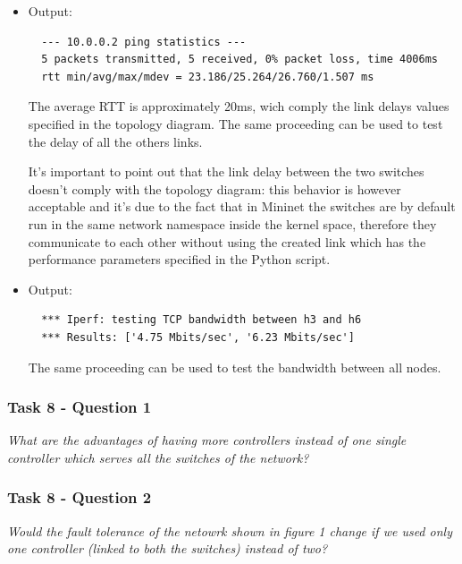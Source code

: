 \begin{itemize}
  \item {}

  Output:
  \begin{lstlisting}
  --- 10.0.0.2 ping statistics ---
  5 packets transmitted, 5 received, 0% packet loss, time 4006ms
  rtt min/avg/max/mdev = 23.186/25.264/26.760/1.507 ms
  \end{lstlisting}
  The average RTT is approximately 20ms, wich comply the link delays values
  specified in the topology diagram. The same proceeding can be used to test the
  delay of all the others links.

  It's important to point out that the link delay between the two switches doesn't
  comply with the topology diagram: this behavior is however acceptable and it's due to
  the fact that in Mininet the switches are by default run in the same network
  namespace inside the kernel space, therefore they communicate to each other
  without using the created link which has the performance parameters specified
  in the Python script.

  \item {}

  Output:
  \begin{lstlisting}
  *** Iperf: testing TCP bandwidth between h3 and h6
  *** Results: ['4.75 Mbits/sec', '6.23 Mbits/sec']
  \end{lstlisting}

  The same proceeding can be used to test the bandwidth between all nodes.
\end{itemize}



\subsubsection*{Task 8 - Question 1}
\textit{What are the advantages of having more controllers instead of
one single controller which serves all the switches of the network?}




\subsubsection*{Task 8 - Question 2}
\textit{Would the fault tolerance of the netowrk shown in figure 1
change if we used only one controller (linked to both the switches)
instead of two?}




